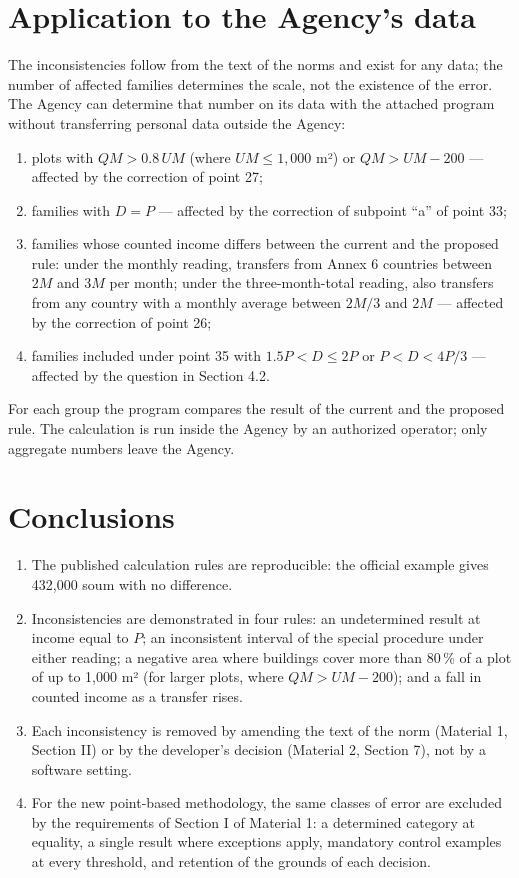 \documentclass[12pt,a4paper]{extarticle}
\begin{document}
\section{Application to the Agency’s data}\label{sec:agency}
The inconsistencies follow from the text of the norms and exist for any data; the number of affected families determines the scale, not the existence of the error. The Agency can determine that number on its data with the attached program without transferring personal data outside the Agency:
\begin{enumerate}[leftmargin=1.27cm]
\item plots with $QM>0.8\,UM$ (where $UM\le1{,}000$ m²) or $QM>UM-200$ — affected by the correction of point 27;
\item families with $D=P$ — affected by the correction of subpoint “a” of point 33;
\item families whose counted income differs between the current and the proposed rule: under the monthly reading, transfers from Annex 6 countries between $2M$ and $3M$ per month; under the three-month-total reading, also transfers from any country with a monthly average between $2M/3$ and $2M$ — affected by the correction of point 26;
\item families included under point 35 with $1.5P<D\le2P$ or $P<D<4P/3$ — affected by the question in Section 4.2.
\end{enumerate}
For each group the program compares the result of the current and the proposed rule. The calculation is run inside the Agency by an authorized operator; only aggregate numbers leave the Agency.

\section{Conclusions}
\begin{enumerate}[leftmargin=1.27cm]
\item The published calculation rules are reproducible: the official example gives 432,000 soum with no difference.
\item Inconsistencies are demonstrated in four rules: an undetermined result at income equal to $P$; an inconsistent interval of the special procedure under either reading; a negative area where buildings cover more than 80\,\% of a plot of up to 1,000 m² (for larger plots, where $QM>UM-200$); and a fall in counted income as a transfer rises.
\item Each inconsistency is removed by amending the text of the norm (Material 1, Section II) or by the developer’s decision (Material 2, Section 7), not by a software setting.
\item For the new point-based methodology, the same classes of error are excluded by the requirements of Section I of Material 1: a determined category at equality, a single result where exceptions apply, mandatory control examples at every threshold, and retention of the grounds of each decision.
\end{enumerate}
\end{document}
